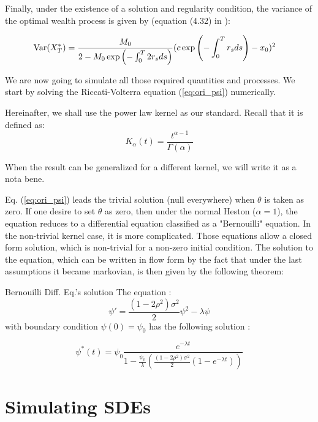 Finally, under the existence of a solution and regularity condition, the variance of the optimal wealth process is given by (equation (4.32) in \cite{HanWong}): 

\begin{align}
\label{eq:variance_process}
\mathrm{Var} ( X_T^* ) 
&= \frac{ M_0} { 2 - M_0 \exp \left ( - \int_0^T 2 r_s ds  \right ) } ( c \exp \left ( -  \int_0^T r_s ds \right ) - x_0 )^2
\end{align}


We are now going to simulate all those required quantities and processes. We start by solving the Riccati-Volterra equation (\ref{eq:ori_psi}) numerically.

\begin{remarque}
Hereinafter, we shall use the power law kernel as our standard. Recall that it is defined as:
$$ K_{\alpha}(t) = \frac{t^{\alpha - 1 }  }{ \Gamma( \alpha ) }$$

When the result can be generalized for a different kernel, we will write it as a nota bene.
\end{remarque}

\begin{remarque}
Eq. (\ref{eq:ori_psi}) leads the trivial solution (null everywhere) when $\theta$ is taken as zero. If one desire to set $\theta$ as zero, then under the normal Heston ($\alpha = 1$), the equation reduces to a differential equation classified as a "Bernouilli" equation. In the non-trivial kernel case, it is more complicated. Those equations allow a closed form solution, which is non-trivial for a non-zero initial condition. The solution to the equation, which can be written in flow form by the fact that under the last assumptions it became markovian, is then given by the following theorem:
\end{remarque}

\begin{theoreme}{Bernouilli Diff. Eq.'s solution }
The equation : 
$$\psi ' = \frac{(1 - 2 \rho ^2) \sigma ^2}{2}  \psi ^2 - \lambda \psi $$
with boundary condition $\psi(0) = \psi_0 $  has the following solution :

$$ \psi^* (t) = \psi_0 \frac { e^{ - \lambda t } } 
{  1 - \frac {\psi_0}{\lambda}   \left ( \frac{(1 - 2 \rho ^2) \sigma ^2}{2} ( 1 - e^{- \lambda t } ) \right )
}  $$
\end{theoreme}



\section{Simulating SDEs }

